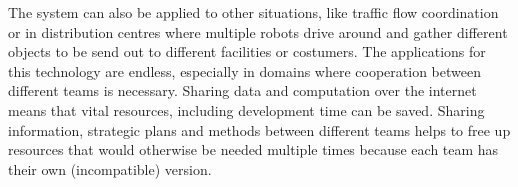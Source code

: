 The system can also be applied to other situations, like traffic flow
coordination or in distribution centres where multiple robots drive around and
gather different objects to be send out to different facilities or costumers.
The applications for this technology are endless, especially in domains where
cooperation between different teams is necessary. Sharing data and computation
over the internet means that vital resources, including development time can be
saved. Sharing information, strategic plans and methods between different teams
helps to free up resources that would otherwise be needed multiple times
because each team has their own (incompatible) version.